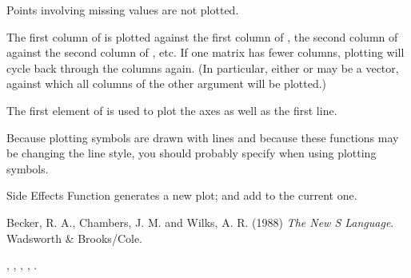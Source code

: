 %
\begin{Details}\relax
Points involving missing values are not plotted.

The first column of  is plotted against the first column of
, the second column of  against the second column of
, etc.  If one matrix has fewer columns, plotting will cycle
back through the columns again.  (In particular, either  or
 may be a vector, against which all columns of the other
argument will be plotted.)

The first element of  is used to plot the axes
as well as the first line.

Because plotting symbols are drawn with lines and because these
functions may be changing the line style, you should probably specify
 when using plotting symbols.
\end{Details}
%
\begin{Section}{Side Effects}
Function  generates a new plot;
 and  add to the current one.
\end{Section}
%
\begin{References}\relax
Becker, R. A., Chambers, J. M. and Wilks, A. R. (1988)
\emph{The New S Language}.
Wadsworth \& Brooks/Cole.
\end{References}
%
\begin{SeeAlso}\relax
{}, , ,
, .
\end{SeeAlso}
%
